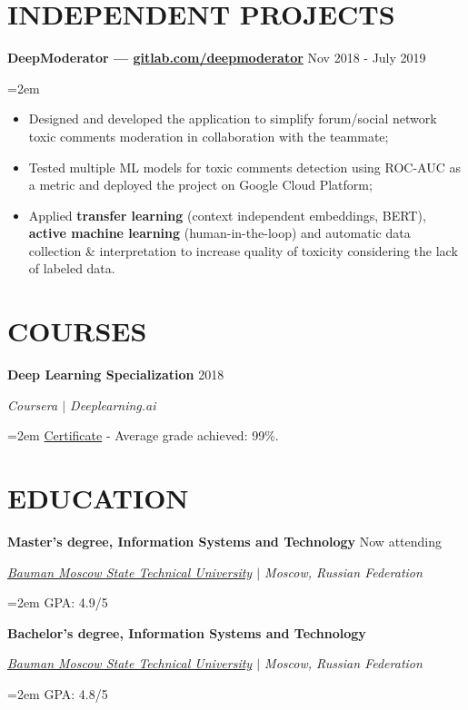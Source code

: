 \documentclass{article}
\newcommand{\NewPart}[1]{\section*{{\color{gray}\uppercase{#1}}}}
\newcommand{\ExperienceEntry}[4]{
		\noindent \textbf{#1} \hfill  
		\hfill #2 \par  %
		\noindent \textit{#3} \par        %
		\noindent\hangindent=2em\hangafter=0 \small #4 %
		\normalsize \par}
\begin{document}
\NewPart{Independent Projects}{}
\ExperienceEntry
{DeepModerator  --- {\href{https://gitlab.com/deepmoderator} {gitlab.com/deepmoderator}}}
{Nov 2018 - July 2019}
{}
{\begin{itemize}
	\item{Designed and developed the application to simplify forum/social network toxic comments moderation in collaboration with the teammate;}
	\item{Tested multiple ML models for toxic comments detection using ROC-AUC as a metric and deployed the project on Google Cloud Platform;}
	\item{Applied \textbf{transfer learning} (context independent embeddings, BERT), \textbf{active machine learning} (human-in-the-loop) and automatic data collection \& interpretation to increase quality of toxicity considering the lack of labeled data.}
\end{itemize}
}

\NewPart{Courses}{}
\ExperienceEntry
{Deep Learning Specialization}
{2018}
{Coursera $\vert$ Deeplearning.ai}
{\href{https://www.coursera.org/account/accomplishments/specialization/V5P6NWX4CR95} {Certificate} - Average grade achieved: 99\%.}

\NewPart{Education}{}
\ExperienceEntry
{Master's degree, Information Systems and Technology}
{Now attending}
{\href{http://bmstu.ru/en}{Bauman Moscow State Technical University} $\vert$ Moscow, Russian Federation}
{GPA: 4.9/5}
\ExperienceEntry
{Bachelor's degree, Information Systems and Technology}
{}
{\href{http://bmstu.ru/en}{Bauman Moscow State Technical University} $\vert$ Moscow, Russian Federation}
{GPA: 4.8/5}
\end{document}
